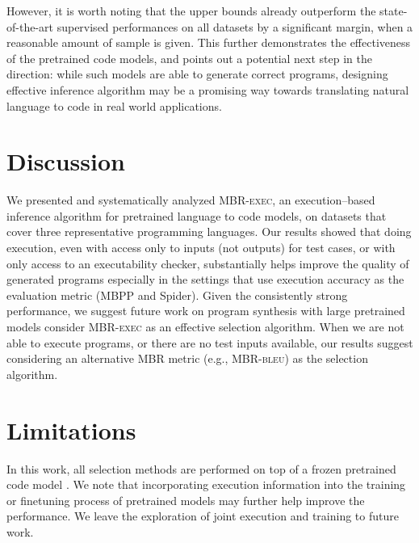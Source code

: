\documentclass[11pt]{article}
\newcommand{\mbrexec}{\textsc{MBR-exec}\xspace}
\newcommand{\mbrbleu}{\textsc{MBR-bleu}\xspace}
\begin{document}
However, it is worth noting that the upper bounds already outperform the state-of-the-art supervised performances on all datasets by a significant margin, when a reasonable amount of sample is given. This further demonstrates the effectiveness of the pretrained code models, and points out a potential next step in the direction: while such models are able to generate correct programs, designing effective inference algorithm may be a promising way towards translating natural language to code in real world applications.  \section{Discussion}
\label{sec:discussion}
We presented and systematically analyzed \mbrexec, an execution--based inference algorithm for pretrained language to code models, on datasets that cover three representative programming languages. Our results showed that doing execution, even with access only to inputs (not outputs) for test cases, or with only access to an executability checker, substantially helps improve the quality of generated programs especially in the settings that use execution accuracy as the evaluation metric (MBPP and Spider). Given the consistently strong performance, we suggest future work on program synthesis with large pretrained models consider \mbrexec as an effective selection algorithm. When we are not able to execute programs, or there are no test inputs available, our results suggest considering an alternative MBR metric (e.g., \mbrbleu) as the selection algorithm.


\section*{Limitations}
In this work, all selection methods are performed on top of a frozen pretrained code model \citep[Codex;][]{chen2021evaluating}. We note that incorporating execution information into the training or finetuning process of pretrained models may further help improve the performance. We leave the exploration of joint execution and training to future work. 
\end{document}
